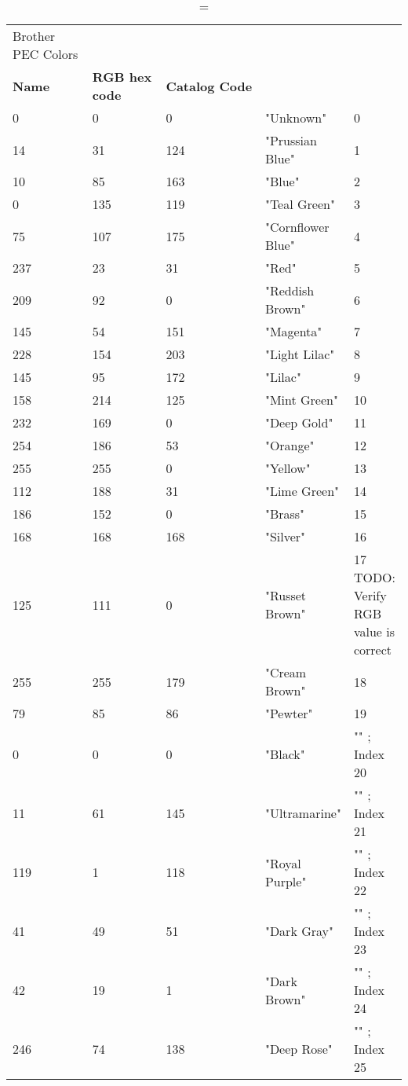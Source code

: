 
\begin{longtable}{p{0.3\linewidth} p{0.3\linewidth} p{0.4\linewidth}}
\caption = {Brother PEC Colors}
\label{tblr:pec}\\
\textbf{Name} & \textbf{RGB hex code} & \textbf{Catalog Code} \\
  0 &    0 &    0 &  "Unknown" &          0\\
 14 &   31 &  124 &  "Prussian Blue" &    1\\
 10 &   85 &  163 &  "Blue" &             2\\
  0 &  135 &  119 &  "Teal Green" &       3\\
 75 &  107 &  175 &  "Cornflower Blue" &  4\\
237 &   23 &   31 &  "Red" &              5\\
209 &   92 &    0 &  "Reddish Brown" &    6\\
145 &   54 &  151 &  "Magenta" &          7\\
228 &  154 &  203 &  "Light Lilac" &      8\\
145 &   95 &  172 &  "Lilac" &            9\\
158 &  214 &  125 &  "Mint Green" &       10\\
232 &  169 &    0 &  "Deep Gold" &        11\\
254 &  186 &   53 &  "Orange" &           12\\
255 &  255 &    0 &  "Yellow" &           13\\
112 &  188 &   31 &  "Lime Green" &       14\\
186 &  152 &    0 &  "Brass" &            15\\
168 &  168 &  168 &  "Silver" &           16\\
125 &  111 &    0 &  "Russet Brown" &     17 TODO: Verify RGB value is correct\\
255 &  255 &  179 &  "Cream Brown" &      18\\
 79 &   85 &   86 &  "Pewter" &           19\\
  0 &    0 &    0 &  "Black" &            "" ; Index 20\\
 11 &   61 &  145 &  "Ultramarine" &      "" ; Index 21\\
119 &    1 &  118 &  "Royal Purple" &     "" ; Index 22\\
 41 &   49 &   51 &  "Dark Gray" &        "" ; Index 23\\
 42 &   19 &    1 &  "Dark Brown" &       "" ; Index 24\\
246 &   74 &  138 &  "Deep Rose" &        "" ; Index 25\\

\end{longtable}
